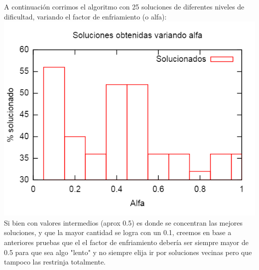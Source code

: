A continuación corrimos el algoritmo con 25 soluciones de diferentes niveles de dificultad, variando el factor de enfriamiento (o alfa):
\includegraphics[scale=0.6]{imgs/porc_soluc.png}	
Si bien con valores intermedios (aprox 0.5) es donde se concentran las mejores soluciones, y que la mayor cantidad se logra con un 0.1, creemos en base a anteriores pruebas que el el factor de enfriamiento debería ser siempre mayor de 0.5 para que sea algo "lento" y no siempre elija ir por soluciones vecinas pero que tampoco las restrinja totalmente.
